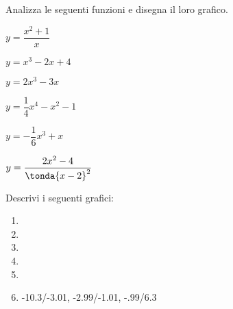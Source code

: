 \begin{esercizio}\label{ese:stufun.1e}
Analizza le seguenti funzioni e disegna il loro grafico.
\begin{multicols}{3}
 \begin{enumeratea}
  \item \(y = \dfrac{x^2 +1}{x}\) \\ %
  \item \(y = x^3-2x+4\) %
  \item \(y = 2x^3-3x\) \\ %
  \item \(y = \dfrac{1}{4}x^4-x^2-1\) %
  \item \(y = -\dfrac{1}{6}x^3+x\) \\ %
  \item \(y = \dfrac{2x^2-4}{\tonda{x-2}^2}\) %
 \end{enumeratea}
\end{multicols}
\end{esercizio}


\begin{esercizio}\label{ese:stufun.2g}
Descrivi i seguenti grafici:

\begin{multicols}{2}
\begin{enumerate} [left=0pt, label=\alph*)]
\item \myp 
{} %
\item \myp 
{}%
\item \myp 
{}%
\item \myp 
{} %
\item \myp 
{} %
\item \myp 
{} 
{-10.3/-3.01, -2.99/-1.01, -.99/6.3}%
\end{enumerate}
\end{multicols}
\end{esercizio}

